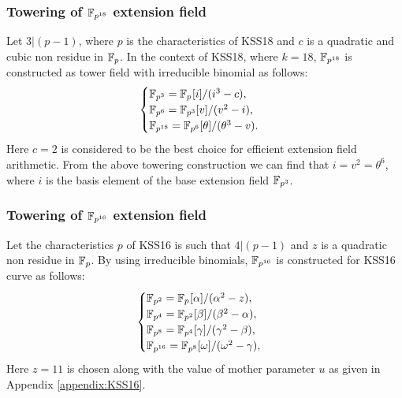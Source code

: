 \subsubsection{Towering of $\mathbb{F}_{p^{18}}$ extension field}
Let $3|(p-1)$, where $p$ is the characteristics of KSS18 and $c$ is a quadratic and cubic non residue in ${\mathbb{F}}_{p}$. In the context  of KSS18, where $k=18$, $\mathbb{F}_{p^{18}}$ is constructed as tower field with irreducible binomial as follows:
\begin{equation}\label{eq:KSS18_towering}
\begin{cases}
{\mathbb{F}}_{p^{3}} = {\mathbb{F}}_{p^{}}[i]/(i^3-c),  \\ 
{\mathbb{F}}_{p^{6}} = {\mathbb{F}}_{p^{3}}[v]/(v^2-i),  \\ 
{\mathbb{F}}_{p^{18}} = {\mathbb{F}}_{p^{6}}[\theta]/(\theta^3-v). \\ 
\end{cases}
\end{equation}
Here $c = 2$ is considered to be the best choice for efficient extension field arithmetic.
From the above towering construction we can find that $i=v^2=\theta^6$, where $i$ is the basis element of the base extension field $\mathbb{F}_{p^3}$. 

\subsubsection{Towering of $\mathbb{F}_{p^{16}}$ extension field}
Let the characteristics $p$ of KSS16 is such that  $4|(p-1)$  and $z$ is a quadratic non residue in ${\mathbb{F}}_{p}$. By using irreducible binomials, $\mathbb{F}_{p^{16}}$ is constructed for KSS16 curve  as follows:
\begin{equation}\label{eq_bls_towering}
\begin{cases}
{\mathbb{F}}_{p^{2}} = {\mathbb{F}}_{p^{}}[\alpha]/(\alpha^2-z),  \\ 
{\mathbb{F}}_{p^{4}} = {\mathbb{F}}_{p^{2}}[\beta]/(\beta^2-\alpha),  \\ 
{\mathbb{F}}_{p^{8}} = {\mathbb{F}}_{p^{4}}[\gamma]/(\gamma^2-\beta), \\ 
{\mathbb{F}}_{p^{16}} = {\mathbb{F}}_{p^{8}}[\omega]/(\omega^2-\gamma), \\ 
\end{cases}
\end{equation}
Here $z = 11$ is chosen along with the value of mother parameter $u$ as given in Appendix \ref{appendix:KSS16}.

